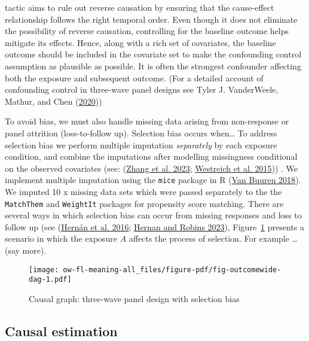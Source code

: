 \documentclass[
  singlecolumn]{report}
\begin{document}
\begin{enumerate}
  tactic aims to rule out reverse causation by ensuring that the
  cause-effect relationship follows the right temporal order. Even
  though it does not eliminate the possibility of reverse causation,
  controlling for the baseline outcome helps mitigate its effects.
  Hence, along with a rich set of covariates, the baseline outcome
  should be included in the covariate set to make the confounding
  control assumption as plausible as possible. It is often the strongest
  confounder affecting both the exposure and subsequent outcome. (For a
  detailed account of confounding control in three-wave panel designs
  see Tyler J. VanderWeele, Mathur, and Chen
  (\protect\hyperlink{ref-vanderweele2020}{2020}))
\end{enumerate}

To avoid bias, we must also handle missing data arising from
non-response or panel attrition (loss-to-follow up). Selection bias
occurs when\ldots{} To address selection bias we perform multiple
imputation \emph{separately} by each exposure condition, and combine the
imputations after modelling missingness conditional on the observed
covariates (see: (\protect\hyperlink{ref-zhang2023}{Zhang et al. 2023};
\protect\hyperlink{ref-westreich2015}{Westreich et al. 2015})) . We
implement multiple imputation using the \texttt{mice} package in R
(\protect\hyperlink{ref-vanbuuren2018}{Van Buuren 2018}). We imputed 10
x missing data sets which were passed separately to the the
\texttt{MatchThem} and \texttt{WeightIt} packages for propensity score
matching. There are several ways in which selection bias can occur from
missing responses and loss to follow up (see
(\protect\hyperlink{ref-hernuxe1n2016}{Hernán et al. 2016};
\protect\hyperlink{ref-hernan2023}{Hernan and Robins 2023}),
Figure~\ref{fig-outcomewide-dag} presents a scenario in which the
exposure \(A\) affects the process of selection. For example \ldots{}
(say more).

\begin{figure}

{\centering \texttt{[image: ow-fl-meaning-all\_files/figure-pdf/fig-outcomewide-dag-1.pdf]}

}

\caption{\label{fig-outcomewide-dag}Causal graph: three-wave panel
design with selection bias}

\end{figure}

\hypertarget{causal-estimation}{%
\subsection{Causal estimation}\label{causal-estimation}}
\end{document}
